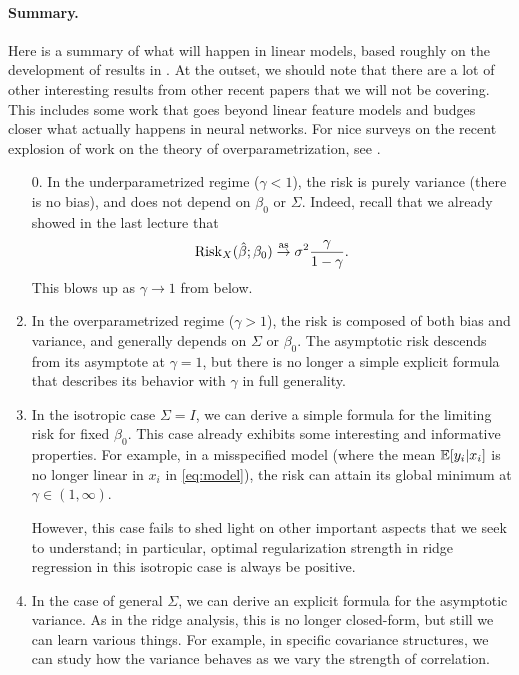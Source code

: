 \documentclass{article}
\begin{document}
\paragraph{Summary.}

Here is a summary of what will happen in linear models, based roughly on the
development of results  in \citet{hastie2022surprises}. At the outset, we should
note that there are a lot of other interesting results from other recent papers
that we will not be covering. This includes some work that goes beyond linear
feature models and budges closer what actually happens in neural networks. For
nice surveys on the recent explosion of work on the theory of
overparametrization, see \citet{bartlett2021deep, belkin2021fit,
  dar2021farewell}.      

\begin{enumerate}
\item[0.]
In the underparametrized regime ($\gamma < 1$), the risk is purely variance
(there is no bias), and does not depend on $\beta_0$ or $\Sigma$. Indeed, recall
that we already showed in the last lecture that
\begin{equation}
\label{eq:ls_risk_limit}
\mathrm{Risk}_X(\hat{\beta}; \beta_0) \overset{\mathrm{as}}{\to} \sigma^2 \frac{\gamma}{1-\gamma}.
\end{equation}
This blows up as $\gamma \to 1$ from below. 

\item
In the overparametrized regime ($\gamma > 1$), the risk is composed of both
bias and variance, and generally depends on $\Sigma$ or $\beta_0$. The
asymptotic risk descends from its asymptote at $\gamma = 1$, but there is no
longer a simple explicit formula that describes its behavior with $\gamma$ in
full generality.

\item
In the isotropic case $\Sigma = I$, we can derive a simple formula for the
limiting risk for fixed $\beta_0$. This case already exhibits some interesting
and informative properties. For example, in a misspecified model (where the mean
$\mathbb{E}[y_i|x_i]$ is no longer linear in $x_i$ in \eqref{eq:model}), the risk can
attain its global minimum at $\gamma \in (1,\infty)$. 

However, this case fails to shed light on other important aspects that we seek
to understand; in particular, optimal regularization strength in ridge
regression in this isotropic case is always be positive.

\item
In the case of general $\Sigma$, we can derive an explicit formula for the
asymptotic variance. As in the ridge analysis, this is no longer closed-form,
but still we can learn various things. For example, in specific covariance
structures, we can study how the variance behaves as we vary the strength of 
correlation.  


\end{enumerate}
\end{document}

